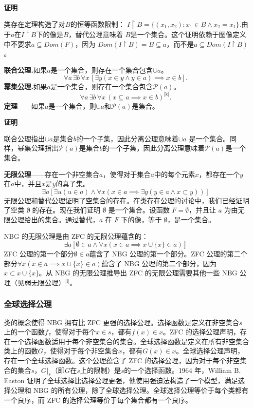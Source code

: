 \textbf{证明} 

类存在定理构造了对\( B \)的恒等函数限制：  
\(I \upharpoonright B = \{(x_1, x_2) : x_1 \in B \land x_2 = x_1\}.
\)由于\( a \)在\( I \upharpoonright B \)下的像是\( B \)，替代公理意味着 \( B \)是一个集合。这个证明依赖于图像定义中不要求\( a \subseteq Dom(F) \)，因为 \( Dom(I \upharpoonright B) = B \subseteq a \)，而不是\( a \subseteq Dom(I \upharpoonright B) \)。


\textbf{联合公理.}如果\( a \)是一个集合，则存在一个集合包含\( \cup a \)。  
\[
\forall a \, \exists b \, \forall x \, \left[ \exists y (x \in y \land y \in a) \implies x \in b \right].~
\]
\textbf{幂集公理.}如果\( a \)是一个集合，则存在一个集合包含\( \mathcal{P}(a) \)。  
\[
\forall a \, \exists b \, \forall x \, (x \subseteq a \implies x \in b)^\text{[k]}.~
\]
\textbf{定理}——如果\( a \)是一个集合，则\( \cup a \)和\( \mathcal{P}(a) \)是集合。

\textbf{证明}  

联合公理指出\( \cup a \)是集合\( b \)的一个子集，因此分离公理意味着\( \cup a \) 是一个集合。同样，幂集公理指出\( \mathcal{P}(a) \)是集合\( b \)的一个子集，因此分离公理意味着\( \mathcal{P}(a) \)是一个集合。

\textbf{无限公理}——存在一个非空集合\( a \)，使得对于集合\( a \)中的每个元素\( x \)，都存在一个\( y \)在\( a \)中，并且\( x \)是\( y \)的真子集。
\[
\exists a \left[ \exists u (u \in a) \land \forall x (x \in a \implies \exists y (y \in a \land x \subset y)) \right]~
\]
无限公理和替代公理证明了空集合的存在。在类存在公理的讨论中，我们已经证明了空类 \( \emptyset \) 的存在。现在我们证明 \( \emptyset \) 是一个集合。设函数 \( F = \emptyset \)，并且让 \( a \) 为由无限公理给出的集合。通过替代，\( a \) 在 \( F \) 下的像，等于 \( \emptyset \)，是一个集合。

NBG 的无限公理是由 ZFC 的无限公理蕴含的：
\[
\exists a [ \emptyset \in a \land \forall x (x \in a \implies x \cup \{x\} \in a) ]~
\]
ZFC 公理的第一个部分\( \emptyset \in a \)蕴含了 NBG 公理的第一个部分。ZFC 公理的第二个部分\( \forall x (x \in a \implies x \cup \{x\} \in a) \)蕴含了 NBG 公理的第二个部分，因为\( x \subset x \cup \{x\} \)。从 NBG 的无限公理推导出 ZFC 的无限公理需要其他一些 NBG 公理（见弱无限公理）\(^\text{[l]}\)。
\subsubsection{全球选择公理}
类的概念使得 NBG 拥有比 ZFC 更强的选择公理。选择函数是定义在非空集合\( s \)上的一个函数\( f \)，使得对于每个\( x \in s \)，都有\( f(x) \in x \)。ZFC 的选择公理声明，存在一个选择函数适用于每个非空集合的集合。全球选择函数是定义在所有非空集合类上的函数\( G \)，使得对于每个非空集合\( x \)，都有\( G(x) \in x \)。全球选择公理声明，存在一个全球选择函数。这个公理蕴含了 ZFC 的选择公理，因为对于每个非空集合的集合\( s \)，\( G|_s \)（即\( G \)在\( s \)上的限制）是\( s \)的一个选择函数。1964 年，William B. Easton 证明了全球选择比选择公理更强，他使用强迫法构造了一个模型，满足选择公理和 NBG 的所有公理，除了全球选择公理。全球选择公理等价于每个类都有一个良序，而 ZFC 的选择公理等价于每个集合都有一个良序。

